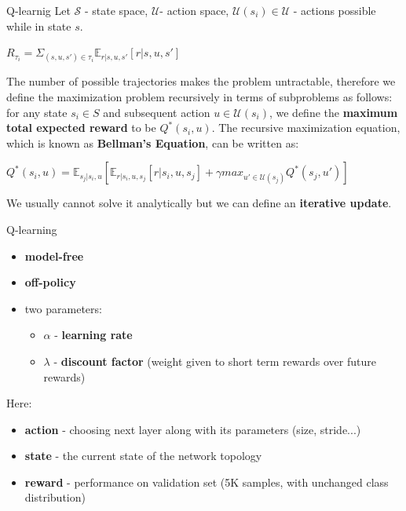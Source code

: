 \documentclass{beamer}
\begin{document}
\begin{frame}{Q-learnig}
  Let $\mathcal{S}$ - state space, $\mathcal{U}$- action space, $\mathcal{U}(s_i) \in \mathcal{U}$ - actions possible while in state $s$.

  \begin{center}
  $R_{\tau_i} = \Sigma_{(s, u, s') \in \tau_i} \mathds{E}_{r|s, u, s'}[r|s, u, s']$
  \end{center}

  The number of possible trajectories makes the problem untractable, therefore we define the maximization problem recursively in terms of subproblems as follows: for any state $s_i \in S$ and subsequent action $u \in \mathcal{U}(s_i)$, we define the \textbf{maximum total expected reward} to be $Q^*(s_i, u)$. The recursive maximization equation, which is known as \textbf{Bellman's Equation}, can be written as:

  \begin{center}
  $Q^*(s_i, u) = \mathds{E}_{s_j|s_i, u}[ \mathds{E}_{r|s_i, u, s_j}[r|s_i, u, s_j] + \gamma max_{u' \in \mathcal{U}(s_j)} Q^*(s_j, u') ]$ 
  \end{center}

  We usually cannot solve it analytically but we can define an \textbf{iterative update}.
\end{frame}


\begin{frame}{Q-learning}
  \begin{itemize}
  \item \textbf{model-free}
  \item \textbf{off-policy}
  \item two parameters:
  \begin{itemize}
  \item $\alpha$ - \textbf{learning rate}
  \item $\lambda$ - \textbf{discount factor} (weight given to short term rewards over future rewards)
  \end{itemize}
  \end{itemize}
  
  Here:
  \begin{itemize}
  \item \textbf{action} - choosing next layer along with its parameters (size, stride...)
  \item \textbf{state} - the current state of the network topology
  \item \textbf{reward} - performance on validation set (5K samples, with unchanged class distribution)
  \end{itemize}
\end{frame}
\end{document}

